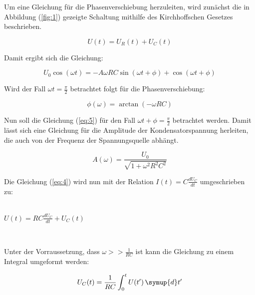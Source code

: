 Um eine Gleichung für die Phasenverschiebung herzuleiten, wird zunächst die in Abbildung (\ref{fig:1})
gezeigte Schaltung mithilfe des Kirchhoffschen Gesetzes beschrieben.

\begin{equation}
  U(t) = U_R(t) + U_C(t)
  \label{eq:4}
\end{equation}

Damit ergibt sich die Gleichung:

\begin{equation}
  U_0 \cos(\omega t) = -A\omega RC \sin(\omega t + \phi) + \cos(\omega t + \phi)
\label{eq:5}
\end{equation}

Wird der Fall $\omega t = \frac{\pi}{2}$ betrachtet folgt für die Phasenverschiebung:

\begin{equation}
  \phi(\omega) = \arctan(-\omega RC)
  \label{eq:6}
\end{equation}

Nun soll die Gleichung (\ref{eq:5}) für den Fall $\omega t + \phi = \frac{\pi}{2}$ betrachtet werden.
Damit lässt sich eine Gleichung für die Amplitude der Kondensatorspannung herleiten, die
auch von der Frequenz der Spannungsquelle abhängt.

\begin{equation}
  A(\omega) = \frac{U_0}{\sqrt{1+\omega^2 R^2 C^2}}
  \label{eq:7}
\end{equation}

Die Gleichung (\ref{eq:4}) wird nun mit der Relation $I(t) = C\frac{dU_C}{dt}$ umgeschrieben zu:\\\\

\centerline{$U(t) = RC \frac{dU_C}{dt} + U_C(t)$} \

Unter der Vorraussetzung, dass $\omega >> \frac{1}{RC}$ ist kann die Gleichung
zu einem Integral umgeformt werden:

\begin{equation}
  U_C(t) = \frac{1}{RC} \int_{0}^{t} U(t')  \, \symup{d}t'
  \label{eq:8}
\end{equation}

